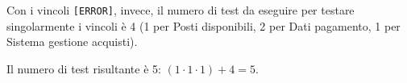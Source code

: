 \noindent Con i vincoli \texttt{[ERROR]}, invece, il numero di test da eseguire per testare singolarmente i vincoli è 4 (1 per Posti disponibili, 2 per Dati pagamento, 1 per Sistema gestione acquisti).

\noindent Il numero di test risultante è 5: $(1 \cdot 1 \cdot 1) + 4 = 5$.
